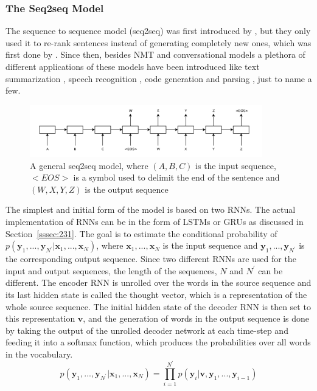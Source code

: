 \documentclass[12pt]{article}
\begin{document}
\subsubsection{The Seq2seq Model} \label{sssec:232}
The sequence to sequence model (seq2seq) was first introduced by \cite{Cho:2014}, but they only used it to re-rank sentences instead of generating completely new ones, which was first done by \cite{Sutskever:2014}. Since then, besides NMT and conversational models a plethora of different applications of these models have been introduced like text summarization \cite{Nallapati:2016}, speech recognition \cite{Chiu:2017}, code generation \cite{Rico:2017} and parsing \cite{Konstas:2017}, just to name a few.

\begin{figure}[H]
	\centering
	\includegraphics[width=0.9\textwidth]{pics/seq2seq.png}
	\caption{A general seq2seq model, where \((A,B,C)\) is the input sequence, \(<EOS>\) is a symbol used to delimit the end of the sentence and \((W,X,Y,Z)\) is the output sequence \cite{Sutskever:2014}}
	\label{fig:232a}
\end{figure}

The simplest and initial form of the model is based on two RNNs. The actual implementation of RNNs can be in the form of LSTMs or GRUs as discussed in Section~\ref{sssec:231}. The goal is to estimate the conditional probability of \(p(\bm{y}_1,...,\bm{y}_{N^{'}}|\bm{x}_1,...,\bm{x}_N)\), where \(\bm{x}_1,...,\bm{x}_N\) is the input sequence and \(\bm{y}_1,...,\bm{y}_{N^{'}}\) is the corresponding output sequence. Since two different RNNs are used for the input and output sequences, the length of the sequences, \(N\) and \(N^{'}\) can be different. The encoder RNN is unrolled over the words in the source sequence and its last hidden state is called the thought vector, which is a representation of the whole source sequence. The initial hidden state of the decoder RNN is then set to this representation \(\bm{v}\), and the generation of words in the output sequence is done by taking the output of the unrolled decoder network at each time-step and feeding it into a softmax function, which produces the probabilities over all words in the vocabulary.
\begin{equation} \label{eq232a}
p(\bm{y}_1,...,\bm{y}_{N^{'}}|\bm{x}_1,...,\bm{x}_N)=\prod_{i=1}^{N^{'}}p(\bm{y}_i|\bm{v},\bm{y}_1,...,\bm{y}_{i-1})
\end{equation}
\end{document}
